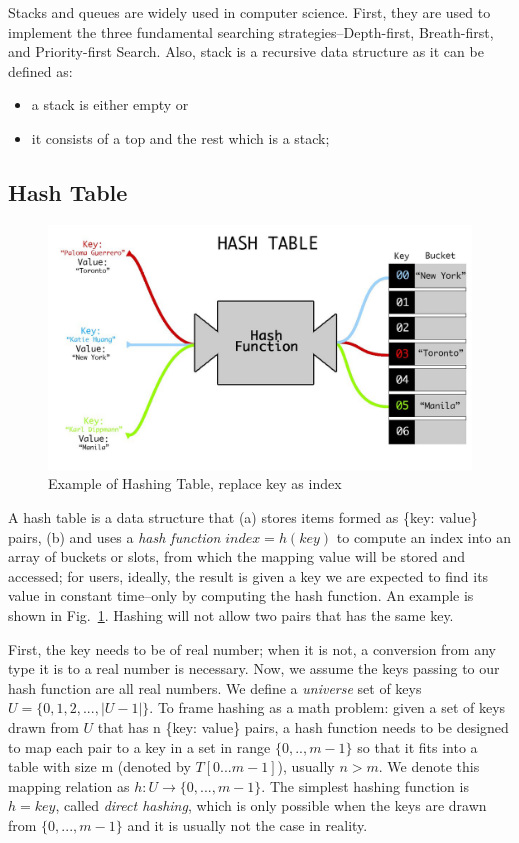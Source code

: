 \documentclass[../main.tex]{subfiles}
\begin{document}
Stacks and queues are widely used in computer science. First, they are used to implement the three fundamental searching strategies--Depth-first, Breath-first, and Priority-first Search. Also, stack is a recursive data structure as it can be defined as:
\begin{itemize}
    \item a stack is either empty or
    \item it consists of a top and the rest which is a stack;  
    \end{itemize}

\subsection{Hash Table}
\begin{figure}[h!]
    \centering
    \includegraphics[width=0.6\columnwidth]{fig/hash_table_1.png}
    \caption{Example of Hashing Table, replace key as index}
    \label{fig:hash_table_1}
\end{figure}
A hash table is a data structure that (a) stores items formed as  \{key: value\} pairs, (b) and uses a \textit{hash function} $index=h(key)$ to compute an index into an array of buckets or slots, from which the mapping value will be stored and accessed; for users, ideally, the result is given a key we are expected to find its value in constant time--only by computing the hash function. An example is shown in Fig.~\ref{fig:hash_table_1}. Hashing will not allow two pairs that has the same key.

First, the key needs to be of real number; when it is not, a conversion from any type it is to a real number is necessary. Now, we assume the keys passing to our hash function are all real numbers. We define a \textit{universe} set of keys $U=\{0,1,2,...,|U-1|\}$. To frame hashing as a math problem: given a set of keys drawn from $U$ that has n \{key: value\} pairs, a hash function needs to be designed to map each pair to a key in a set in range $\{0,..,m-1\}$ so that it fits into a table with size m (denoted by $T[0...m-1]$), usually $n>m$. We denote this mapping relation as $h:U\xrightarrow{}\{0,...,m-1\}$. The simplest hashing function is $h=key$, called \textit{direct hashing}, which is only possible when the keys are drawn from $\{0,...,m-1\}$ and it is usually not the case in reality.
\end{document}
